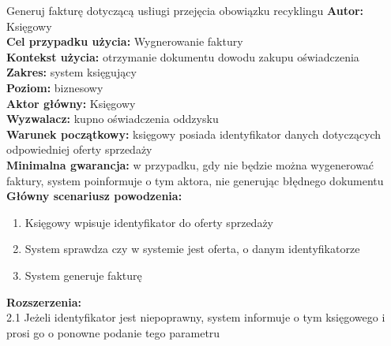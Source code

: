\begin{usecase}{Generuj fakturę dotyczącą usłiugi przejęcia obowiązku recyklingu}
	\textbf{Autor:} Księgowy\\
	\textbf{Cel przypadku użycia:} Wygnerowanie faktury \\
	\textbf{Kontekst użycia:} otrzymanie dokumentu dowodu zakupu oświadczenia  \\
	\textbf{Zakres:} system księgujący \\
	\textbf{Poziom:} biznesowy \\
	\textbf{Aktor główny:} Księgowy \\
	\textbf{Wyzwalacz:} kupno oświadczenia oddzysku \\
	\textbf{Warunek początkowy:} księgowy posiada identyfikator danych dotyczących odpowiedniej oferty sprzedaży \\
	\textbf{Minimalna gwarancja:} w przypadku, gdy nie będzie można wygenerować faktury, system poinformuje o tym aktora, nie generując błędnego dokumentu \\
	\textbf{Główny scenariusz powodzenia:} 
		\begin{enumerate}
			\item Księgowy wpisuje identyfikator do oferty sprzedaży
			\item System sprawdza czy w systemie jest oferta, o danym identyfikatorze
			\item System generuje fakturę 
		\end{enumerate}
	\textbf{Rozszerzenia:} \\
	2.1 Jeżeli identyfikator jest niepoprawny, system informuje o tym księgowego i prosi go o ponowne podanie tego parametru
\end{usecase}

